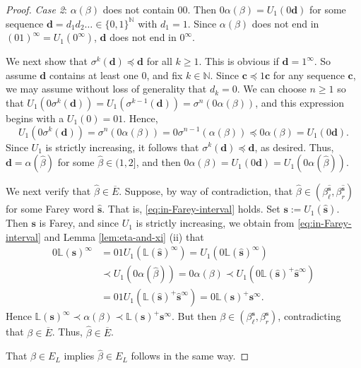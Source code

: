 \documentclass[11pt]{amsart}
\theoremstyle{definition}
\theoremstyle{remark}
\numberwithin{equation}{section}
\newcommand{\N}{\ensuremath{\mathbb{N}}}
\renewcommand{\L}{\ensuremath{\mathbb{L}}}
\renewcommand{\d}{ {\mathbf{d}}}
\newcommand{\s}{ {\mathbf{s}}}
\newcommand{\f}{\infty}
\newcommand{\al}{\alpha}
\newcommand{\lle}{\preccurlyeq}
\newcommand{\si}{\sigma}
\begin{document}
\begin{proof}
\medskip
{\em Case 2}: $\al(\beta)$ does not contain $00$. Then $0\al(\beta)=U_1(0\mathbf{d})$ for some sequence $\mathbf{d}=d_1d_2\dots\in\{0,1\}^\N$ with $d_1=1$. Since $\al(\beta)$ does not end in $(01)^\f=U_1(0^\f)$, $\mathbf{d}$ does not end in $0^\f$.

We next show that $\si^k(\mathbf{d})\lle \mathbf{d}$ for all $k\geq 1$. {This is obvious if $\mathbf{d}=1^\f$. So assume $\mathbf{d}$ contains at least one $0$, and fix $k\in\N$.} Since $\mathbf{c}\lle 1\mathbf{c}$ for any sequence $\mathbf{c}$, {we may assume without loss of generality that $d_k=0$.} %
We can choose $n\geq 1$ so that $U_1(0\si^k(\mathbf{d}))=U_1(\si^{k-1}(\mathbf{d}))=\si^n(0\alpha(\beta))$, and this expression begins with a $U_1(0)=01$. Hence,
\[
U_1(0\si^k(\mathbf{d}))=\si^{n}(0\alpha(\beta))=0\si^{n-1}(\alpha(\beta))\lle 0\alpha(\beta)=U_1(0\mathbf{d}).
\]
Since $U_1$ is strictly increasing, it follows that $\si^k(\mathbf{d})\lle \mathbf{d}$, as desired. Thus, $\mathbf{d}=\alpha(\hat{\beta})$ for some $\hat{\beta}\in(1,2]$, and then
$0\alpha(\beta)=U_1(0\mathbf d)=U_1(0\alpha(\hat{\beta}))$.

We next verify that $\hat{\beta}\in \overline{E}$. Suppose, by way of contradiction, that $\hat{\beta}\in (\beta_\ell^{\hat{\s}},\beta_r^{\hat{\s}})$ for some Farey word $\hat{\s}$. That is, \eqref{eq:in-Farey-interval} holds.
Set $\s:=U_1(\hat{\s})$. Then $\s$ is Farey, and since $U_1$ is strictly increasing, we obtain from \eqref{eq:in-Farey-interval} and Lemma \ref{lem:eta-and-xi} (ii) that
\begin{align*}
0\L(\s)^\f&=01U_1(\L(\hat{\s})^\f)=U_1(0\L(\hat{\s})^\f)\\
&\prec U_1(0\al(\hat{\beta}))=0\al(\beta)\prec U_1(0\L(\hat\s)^+\hat\s^\f)\\
&=01U_1(\L(\hat\s)^+\hat\s^\f)=0\L(\s)^+\s^\f.
\end{align*}
Hence $\L(\s)^\f\prec \alpha(\beta)\prec \L(\s)^+\s^\f$. But then $\beta\in(\beta_\ell^{\s},\beta_r^{\s})$, contradicting that $\beta\in \overline{E}$. Thus, $\hat{\beta}\in \overline{E}$.

That $\beta\in E_L$ implies $\hat{\beta}\in E_L$ follows in the same way.
\end{proof}
\end{document}
